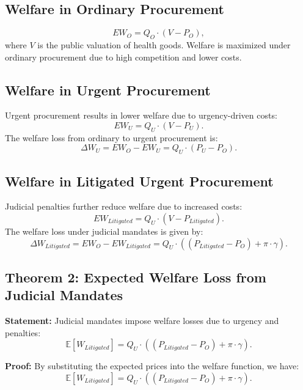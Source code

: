 \documentclass[12pt]{article}
\begin{document}
\subsection{Welfare in Ordinary Procurement}
\[
EW_O = Q_O \cdot (V - P_O),
\]
where \( V \) is the public valuation of health goods. Welfare is maximized under ordinary procurement due to high competition and lower costs.

\subsection{Welfare in Urgent Procurement}
Urgent procurement results in lower welfare due to urgency-driven costs:
\[
EW_U = Q_U \cdot (V - P_U).
\]
The welfare loss from ordinary to urgent procurement is:
\[
\Delta W_U = EW_O - EW_U = Q_U \cdot (P_U - P_O).
\]

\subsection{Welfare in Litigated Urgent Procurement}
Judicial penalties further reduce welfare due to increased costs:
\[
EW_{Litigated} = Q_U \cdot (V - P_{Litigated}).
\]
The welfare loss under judicial mandates is given by:
\[
\Delta W_{Litigated} = EW_O - EW_{Litigated} = Q_U \cdot ((P_{Litigated} - P_O) + \pi \cdot \gamma).
\]

\subsection{Theorem 2: Expected Welfare Loss from Judicial Mandates}

\textbf{Statement:} Judicial mandates impose welfare losses due to urgency and penalties:
\[
\mathbb{E}[W_{Litigated}] = Q_U \cdot \left((P_{Litigated} - P_O) + \pi \cdot \gamma \right).
\]

\textbf{Proof:} By substituting the expected prices into the welfare function, we have:
\[
\mathbb{E}[W_{Litigated}] = Q_U \cdot ((P_{Litigated} - P_O) + \pi \cdot \gamma).
\]
\end{document}
